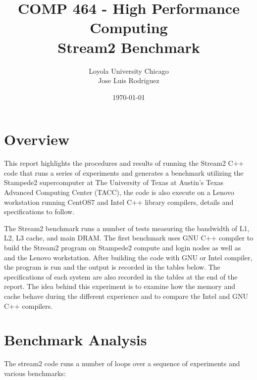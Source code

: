 \documentclass[12pt]{article} %
\title{ COMP 464 - High Performance Computing \\ Stream2 Benchmark} %
\author{
Loyola University Chicago \\
Jose Luis Rodriguez 
} %
\date{\today} %
\begin{document}
\maketitle
\thispagestyle{fancy}


\section{Overview}
This report highlights the procedures and results of running the Stream2 C++ code that runs a series of experiments and generates a benchmark utilizing the Stampede2 supercomputer at The University of Texas at Austin's Texas Advanced Computing Center (TACC), the code is also execute on a Lenovo workstation running CentOS7 and Intel C++ library compilers, details and specifications to follow. 

The Stream2 benchmark runs a number of tests measuring the bandwidth of L1, L2, L3 cache, and main DRAM. The first benchmark uses GNU C++ compiler to build the Stream2 program on Stampede2 compute and login nodes as well as and the Lenovo workstation. After building the code with GNU or Intel compiler, the program is run and the output is recorded in the tables below. The specifications of each system are also recorded in the tables at the end of the report. The idea behind this experiment is to examine how the memory and cache behave during the different experience and to compare the Intel and GNU C++ compilers. 


\section{Benchmark Analysis}

The stream2 code runs a number of loops over a sequence of experiments and various benchmarks:

\begin{table}[ht]
\centering
{}
\end{table}
\end{document}
